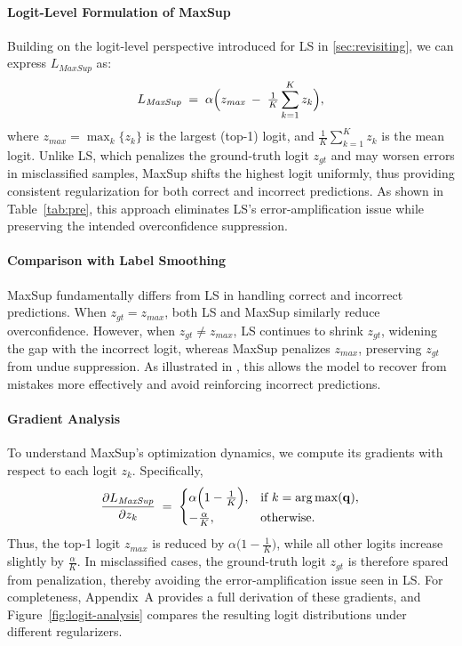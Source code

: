\paragraph{Logit-Level Formulation of MaxSup}
Building on the logit-level perspective introduced for LS in \cref{sec:revisiting}, we can express \(L_{\textit{MaxSup}}\) as:
\begin{equation}
\label{eq:maxsup-uni}
L_{\textit{MaxSup}} 
\;=\;
\alpha 
\Bigl(
    z_{\textit{max}} 
    \;-\; 
    \tfrac{1}{K}\sum_{k=1}^{K} z_k
\Bigr),
\end{equation}
where \(z_{\textit{max}} = \max_k\{z_k\}\) is the largest (top-1) logit, and \(\tfrac{1}{K}\sum_{k=1}^{K} z_k\) is the mean logit. Unlike LS, which penalizes the ground-truth logit \(z_{gt}\) and may worsen errors in misclassified samples, MaxSup shifts the highest logit uniformly, thus providing consistent regularization for both correct and incorrect predictions. As shown in Table~\ref{tab:pre}, this approach eliminates LS’s error-amplification issue while preserving the intended overconfidence suppression. 

\paragraph{Comparison with Label Smoothing}
MaxSup fundamentally differs from LS in handling correct and incorrect predictions. When \( z_{gt} = z_{\textit{max}} \), both LS and MaxSup similarly reduce overconfidence. However, when \( z_{gt} \neq z_{\textit{max}} \), LS continues to shrink \( z_{gt} \), widening the gap with the incorrect logit, whereas MaxSup penalizes \( z_{\textit{max}} \), preserving \( z_{gt} \) from undue suppression. As illustrated in , this allows the model to recover from mistakes more effectively and avoid reinforcing incorrect predictions.

\paragraph{Gradient Analysis}
To understand MaxSup’s optimization dynamics, we compute its gradients with respect to each logit \(z_k\). Specifically,
\begin{equation}
\frac{\partial L_{\textit{MaxSup}}}{\partial z_k}
\;=\;
\begin{cases}
\alpha \Bigl(1 - \tfrac{1}{K}\Bigr), & \text{if } k = \arg\max(\mathbf{q}),\\
-\tfrac{\alpha}{K}, & \text{otherwise}.
\end{cases}
\end{equation}
Thus, the top-1 logit \(z_{\textit{max}}\) is reduced by \(\alpha\bigl(1 - \tfrac{1}{K}\bigr)\), while all other logits increase slightly by \(\tfrac{\alpha}{K}\). In misclassified cases, the ground-truth logit \(z_{gt}\) is therefore spared from penalization, thereby avoiding the error-amplification issue seen in LS. For completeness, Appendix~A provides a full derivation of these gradients, and Figure~\ref{fig:logit-analysis} compares the resulting logit distributions under different regularizers.

